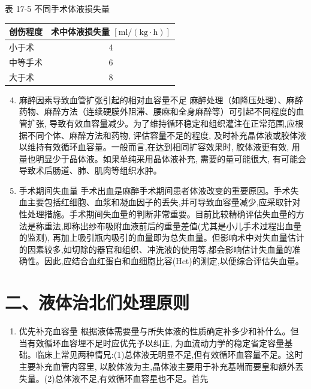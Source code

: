 \documentclass[10pt]{article}
\begin{document}
表 17-5 不同手术体液损失量

\begin{center}
\begin{tabular}{lc}
\hline
创伤程度 & 术中体液损失量 $[\mathrm{ml} /(\mathrm{kg} \cdot \mathrm{h})]$ \\
\hline
小于术 & 4 \\
中等手术 & 6 \\
大于术 & 8 \\
\hline
\end{tabular}
\end{center}

\begin{enumerate}
  \setcounter{enumi}{3}
  \item 麻醉因素导致血管扩张引起的相对血容量不足 麻醉处理（如降压处理）、麻醉药物、麻醉方法（连续硬膜外阻滞、腰麻和全身麻醉等）可引起不同程度的血管扩张, 导致有效血容量减少。为了维持循环稳定和组织灌注在正常范围,应根据不同个体、麻醉方法和药物, 评估容量不足的程度, 及时补充晶体液或胶体液以维持有效循环血容量。一般而言,在达到相同扩容效果时, 胶体液更有效, 用量也明显少于晶体液。如果单纯采用晶体液补充, 需要的量可能很大, 有可能会导致术后肠道、肺、肌肉等组织水肿。

  \item 手术期间失血量 手术出血是麻醉手术期间患者体液改变的重要原因。手术失血主要包括红细胞、血浆和凝血因子的丢失,并可导致血容量减少,应采取针对性处理措施。手术期间失血量的判断非常重要。目前比较精确评估失血量的方法是称重法,即称出纱布吸附血液前后的重量差值(尤其是小儿手术过程出血量的监测), 再加上吸引瓶内吸引的血量即为总失血量。但影响术中对失血量估计的因素较多,如切除的器官和组织、冲洗液的使用等,都会影响估计失血量的准确性。因此,应结合血红蛋白和血细胞比容(Hct)的测定,以便综合评估失血量。

\end{enumerate}

\section*{二、液体治北们处理原则}
\begin{enumerate}
  \item 优先补充血容量 根据液体需要量与所失体液的性质确定补多少和补什么。但当有效循环血容埋不足时应优先予以纠正, 为血流动力学的稳定省定容量基础。临床上常见两种情兄:(1)总体液无明显不足,但有效循环血容量不足。这时主要补充血管内容里, 以胶体液为主,晶体液主要用于补充基㖄而要皇和额外丟失量。(2)总体液不足,有效循环血容星也不足。首先
\end{enumerate}
\end{document}
